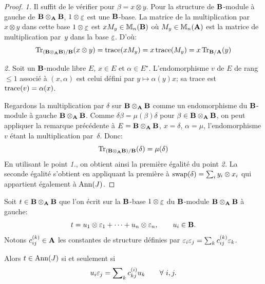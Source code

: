 \documentclass[12pt,twoside,a4paper]{article}
\begin{document}
\begin {proof} %

\textsl{1.} Il suffit de le vérifier pour $\beta = x\otimes y$. Pour
la structure de $\mathbf{B}$-module à gauche de $\mathbf{B}\otimes_{\mathbf{A}}\mathbf{B}$, 
$1\otimes {\underline{{\varepsilon}}}$ est une $\mathbf{B}$-base. La matrice de la multiplication
par $x\otimes y$ dans cette base $1\otimes{\underline{{\varepsilon}}}$ est
$xM_y \in \mathbb {M}_n(\mathbf{B})$ où $M_y \in \mathbb {M}_n(\mathbf{A})$ est la
matrice de multiplication par~$y$ dans la base ${\underline{{\varepsilon}}}$.
D'où:
$$
\mathop{\mathrm{Tr}}\nolimits\nolimits_{(\mathbf{B}\otimes_{\mathbf{A}}\mathbf{B})/\mathbf{B}}(x\otimes y) = \text{\rm trace}(xM_y) =
x\, \text{\rm trace}(M_y) = x\mathop{\mathrm{Tr}}\nolimits\nolimits_{\mathbf{B}/\mathbf{A}}(y)
$$

\smallskip \noindent 
\textsl{2.}
Soit un $\mathbf{B}$-module libre $E$, $x \in E$ et $\alpha\in E^\star$.
L'endomorphisme $v$ de $E$ de rang $\le 1$ associé à $(x,\alpha)$ est
celui défini par $y \mapsto \alpha(y)x$; sa trace est $\text{\rm trace}(v)
= \alpha(x)$.

\noindent Regardons la multiplication par $\delta$ sur $\mathbf{B}\otimes_{\mathbf{A}}\mathbf{B}$ comme un
endomorphisme du $\mathbf{B}$-module à gauche $\mathbf{B}\otimes_{\mathbf{A}}\mathbf{B}$.  Comme $\delta\beta
= \mu(\beta)\delta$ pour $\beta \in \mathbf{B}\otimes_{\mathbf{A}}\mathbf{B}$, on peut appliquer la
remarque précédente à $E = \mathbf{B}\otimes_{\mathbf{A}}\mathbf{B}$, $x = \delta$, $\alpha = \mu$,
l'endomorphisme $v$ étant la multiplication par~$\delta$.  Donc:
$$
\mathop{\mathrm{Tr}}\nolimits\nolimits_{(\mathbf{B}\otimes_{\mathbf{A}}\mathbf{B})/\mathbf{B}}(\delta) = \mu(\delta)
$$
En utilisant le point \textsl{1.}, on obtient ainsi la première égalité du point \textsl{2.}
La seconde égalité s'obtient en appliquant la première à
$\mathrm {swap}(\delta)=\sum\nolimits_i y_i \otimes x_i$ qui appartient également à $\mathrm{Ann}(J)$.
\end {proof}


\begin {lemma}  %
\label {inAnnJ}

Soit $t \in \mathbf{B}\otimes_{\mathbf{A}}\mathbf{B}$ que l'on écrit sur la $\mathbf{B}$-base $1\otimes {\underline{{\varepsilon}}}$
du $\mathbf{B}$-module $\mathbf{B}\otimes_{\mathbf{A}}\mathbf{B}$ à gauche:
$$
t = u_1\otimes {\varepsilon}_1 + \cdots + u_n\otimes{\varepsilon}_n, \qquad u_i \in \mathbf{B}.
$$
Notons $c^{(k)}_{ij} \in \mathbf{A}$ les constantes de structure définies
par ${\varepsilon}_i{\varepsilon}_j = \sum_k c^{(k)}_{ij} {\varepsilon}_k$.

\smallskip \noindent Alors $t \in \mathrm{Ann}(J)$ si et seulement si
$$
u_i{\varepsilon}_j = \sum\nolimits_k c^{(i)}_{kj} u_k \qquad \forall\ i,j.
$$
\end {lemma}
\end{document}
